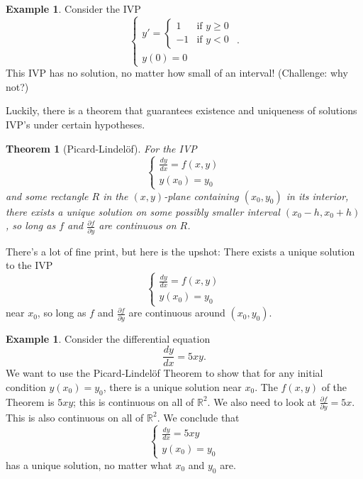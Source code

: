 \documentclass[12pt]{amsart}
\numberwithin{equation}{section}
\theoremstyle{plain} %
\newtheorem{thm}[equation]{Theorem}
\theoremstyle{definition}
\newtheorem{ex}[equation]{Example}
\theoremstyle{remark}
\begin{document}
\begin{ex} Consider the IVP
\[\begin{cases} y' = \begin{cases} 1 & \text{if } y\geq 0 \\ -1 & \text{if } y  <0\end{cases}\\ y(0) = 0\end{cases}.\]
This IVP has no solution, no matter how small of an interval! (Challenge: why not?)
\end{ex}

Luckily, there is a theorem that guarantees existence and uniqueness of solutions IVP's under certain hypotheses.

\begin{thm}[Picard-Lindel\"of] For the IVP
\[\begin{cases} \frac{dy}{dx} = f(x,y) \\ 
y(x_0) = y_0 \end{cases}\]
and some rectangle $R$ in the $(x,y)$-plane containing $(x_0,y_0)$ in its interior,
there exists a unique solution on some possibly smaller interval $(x_0 - h, x_0+h)$, so long as $f$ and $\frac{\partial f}{\partial y}$ are continuous on $R$.
\end{thm}

There's a lot of fine print, but here is the upshot: There exists a unique solution to the IVP
\[\begin{cases} \frac{dy}{dx} = f(x,y) \\ 
y(x_0) = y_0 \end{cases}\]
near $x_0$, so long as $f$ and $\frac{\partial f}{\partial y}$ are continuous around $(x_0,y_0)$.

\begin{ex} Consider the differential equation
\[ \frac{dy}{dx} = 5 xy.\]
We want to use the Picard-Lindel\"of Theorem to show that for any initial condition $y(x_0)=y_0$, there is a unique solution near $x_0$. The $f(x,y)$ of the Theorem is $5xy$; this is continuous on all of $\mathbb{R}^2$. We also need to look at $\frac{\partial f}{\partial y} = 5x$. This is also continuous on all of $\mathbb{R}^2$.
We conclude that 
\[\begin{cases} \frac{dy}{dx} = 5xy \\ 
y(x_0) = y_0 \end{cases}\]
has a unique solution, no matter what $x_0$ and $y_0$ are.
\end{ex}
\end{document}
